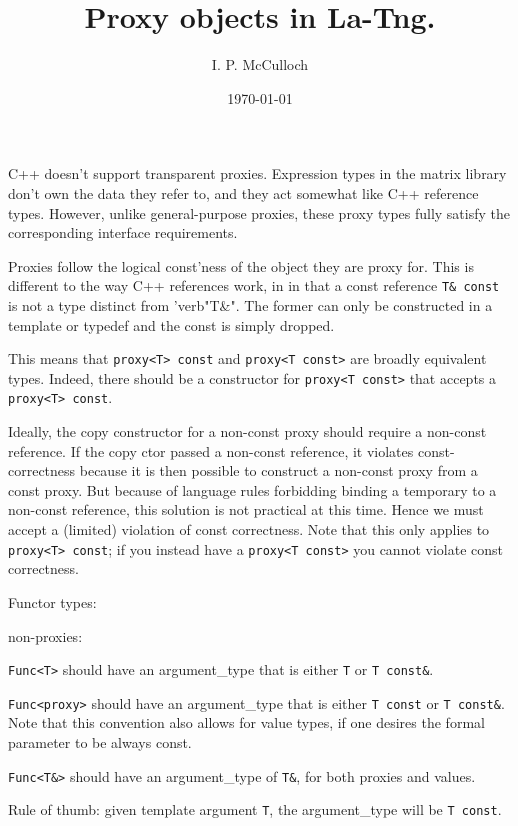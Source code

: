 \documentclass{article}
\begin{document}
\title{Proxy objects in La-Tng.}

\author{I. P. McCulloch}
\date{\today}

\maketitle



C++ doesn't support transparent proxies.  Expression types in the
matrix library don't own the data they refer to, and they act somewhat
like C++ reference types.  However, unlike general-purpose proxies,
these proxy types fully satisfy the corresponding interface requirements.

Proxies follow the logical const'ness of the object they are proxy
for.  This is different to the way C++ references work, in in that a
const reference \verb"T& const" is not a type distinct from
'verb"T\&". The former can only be constructed in a template or typedef
and the const is simply dropped. 

This means that \verb"proxy<T> const" and \verb"proxy<T const>" are
broadly equivalent types. Indeed, there should be a constructor for 
\verb"proxy<T const>" that accepts a \verb"proxy<T> const".

Ideally, the copy constructor for a non-const proxy should require a non-const
reference. If the copy ctor passed a non-const reference, it violates
const-correctness because it is then possible to construct a non-const
proxy from a const proxy. But because of language rules forbidding
binding a temporary to a non-const reference, this solution is not
practical at this time. Hence we must accept a (limited) violation of
const correctness. Note that this only applies to \verb"proxy<T> const"; 
if you instead have a \verb"proxy<T const>" you cannot
violate const correctness.

Functor types:

non-proxies:

\verb"Func<T>" should have an argument\_type that is either
\verb"T" or \verb"T const&".

\verb"Func<proxy>" should have an argument\_type that is either 
\verb"T const" or \verb"T const&". Note that this convention also
allows for value types, if one desires the formal parameter to be
always const.

\verb"Func<T&>" should have an argument\_type of \verb"T&", for both
proxies and values.

Rule of thumb: given template argument \verb"T", the argument\_type
will be \verb"T const".
\end{document}
